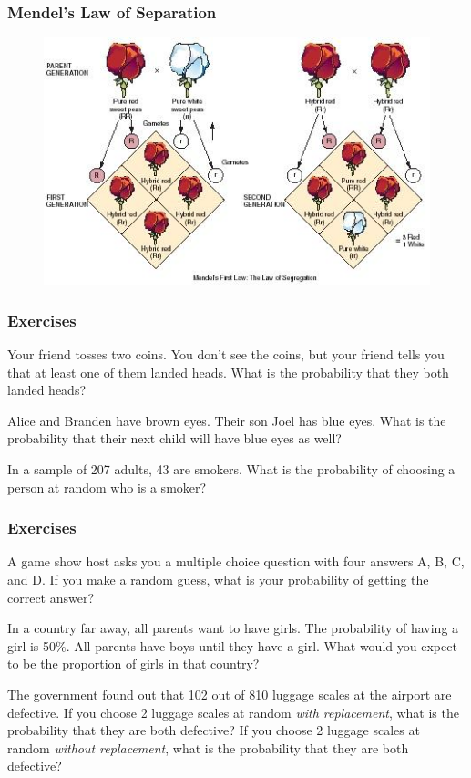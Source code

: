 \documentclass[xcolor=dvipsnames]{beamer}
\begin{document}
\begin{frame}
  \frametitle{Mendel's Law of Separation}
\begin{figure}[h]
\includegraphics[scale=.75]{./diagrams/mendel.jpg}
\end{figure}
\end{frame}

\begin{frame}
  \frametitle{Exercises}
{\ubung} Your friend tosses two coins. You don't see the
coins, but your friend tells you that at least one of them landed
heads. What is the probability that they both landed heads?

{\ubung} Alice and Branden have brown eyes. Their son Joel has blue
eyes. What is the probability that their next child will have blue
eyes as well?

{\ubung} In a sample of 207 adults, 43 are smokers. What
is the probability of choosing a person at random who is a smoker?
\end{frame}

\begin{frame}
  \frametitle{Exercises}
{\ubung} A game show host asks you a multiple choice
question with four answers A, B, C, and D. If you make a random guess,
what is your probability of getting the correct answer?

{\ubung} In a country far away, all parents want to have
girls. The probability of having a girl is 50\%. All parents have boys
until they have a girl. What would you expect to be the proportion of
girls in that country?

{\ubung} The government found out that 102 out of 810
luggage scales at the airport are defective. If you choose 2 luggage
scales at random \emph{with replacement}, what is the probability that
they are both defective? If you choose 2 luggage scales at random
\emph{without replacement}, what is the probability that they are both
defective?
\end{frame}
\end{document}
